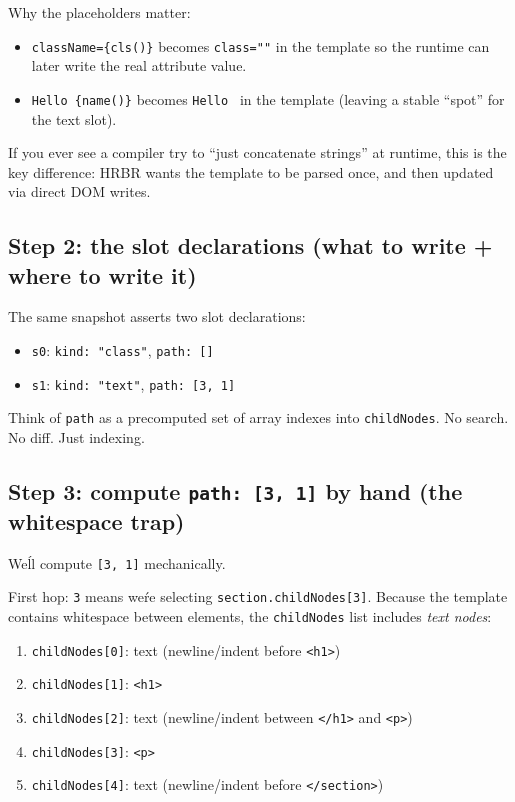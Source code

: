 Why the placeholders matter:

\begin{itemize}
\item \texttt{className=\{cls()\}} becomes \texttt{class=""} in the template so the runtime can later write the real attribute value.
\item \texttt{Hello \{name()\}} becomes \texttt{Hello  } in the template (leaving a stable ``spot'' for the text slot).
\end{itemize}

If you ever see a compiler try to ``just concatenate strings'' at runtime, this is the key difference: HRBR wants the template to be parsed once, and then updated via direct DOM writes.

\subsection{Step 2: the slot declarations (what to write + where to write it)}

The same snapshot asserts two slot declarations:

\begin{itemize}
\item \texttt{s0}: \texttt{kind: "class"}, \texttt{path: []}
\item \texttt{s1}: \texttt{kind: "text"}, \texttt{path: [3, 1]}
\end{itemize}

Think of \texttt{path} as a precomputed set of array indexes into \texttt{childNodes}.
No search. No diff. Just indexing.

\subsection{Step 3: compute \texttt{path: [3, 1]} by hand (the whitespace trap)}

We\'ll compute \texttt{[3, 1]} mechanically.

First hop: \texttt{3} means we\'re selecting \texttt{section.childNodes[3]}.
Because the template contains whitespace between elements, the \texttt{childNodes} list includes \emph{text nodes}:

\begin{enumerate}
\item \texttt{childNodes[0]}: text (newline/indent before \texttt{<h1>})
\item \texttt{childNodes[1]}: \texttt{<h1>}
\item \texttt{childNodes[2]}: text (newline/indent between \texttt{</h1>} and \texttt{<p>})
\item \texttt{childNodes[3]}: \texttt{<p>}
\item \texttt{childNodes[4]}: text (newline/indent before \texttt{</section>})
\end{enumerate}

